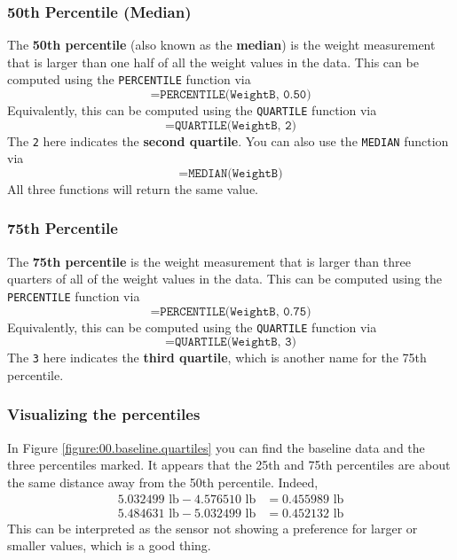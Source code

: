 \subsubsection{50th Percentile (Median)}
The \textbf{50th percentile} (also known as the \textbf{median}) is the weight measurement that is larger than one half of all the weight values in the data. This can be computed using the \texttt{PERCENTILE} function via
\begin{equation}
    \texttt{=PERCENTILE(WeightB, 0.50)}
    \label{eq:00.percentile.50}
\end{equation}
Equivalently, this can be computed using the \texttt{QUARTILE} function via
\begin{equation}
    \texttt{=QUARTILE(WeightB, 2)}
\end{equation}
The \texttt{2} here indicates the \textbf{second quartile}. You can also use the \texttt{MEDIAN} function via
\begin{equation}
    \texttt{=MEDIAN(WeightB)}
    \label{eq:00.median}
\end{equation}
All three functions will return the same value.
\subsubsection{75th Percentile}
The \textbf{75th percentile} is the weight measurement that is larger than three quarters of all of the weight values in the data. This can be computed using the \texttt{PERCENTILE} function via
\begin{equation}
    \texttt{=PERCENTILE(WeightB, 0.75)}
    \label{eq:00.percentile.75}
\end{equation}
Equivalently, this can be computed using the \texttt{QUARTILE} function via
\begin{equation}
    \texttt{=QUARTILE(WeightB, 3)}
\end{equation}
The \texttt{3} here indicates the \textbf{third quartile}, which is another name for the 75th percentile.
\subsubsection{Visualizing the percentiles}
In Figure \ref{figure:00.baseline.quartiles} you can find the baseline data and the three percentiles marked. It appears that the 25th and 75th percentiles are about the same distance away from the 50th percentile. Indeed,
\begin{align}
    5.032499\text{ lb} - 4.576510\text{ lb} &= 0.455989 \text{ lb} \\
    5.484631\text{ lb} - 5.032499\text{ lb} &= 0.452132 \text{ lb}
\end{align}
This can be interpreted as the sensor not showing a preference for larger or smaller values, which is a good thing.

